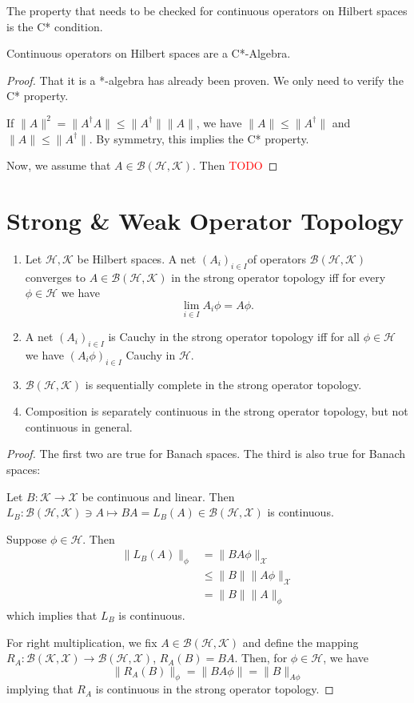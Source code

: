 \documentclass[twoside,symmetric, openany, 12pt]{./tuftebook}
\theoremstyle{definition}
\theoremstyle{definition}
\theoremstyle{definition}
\newenvironment{parts}{\begin{enumerate}[label=(\alph*)]}{\end{enumerate}}
\begin{document}
The property that needs to be checked for continuous operators on Hilbert spaces is the C* condition. 
\begin{Proposition}
	Continuous operators on Hilbert spaces are a C*-Algebra.
\end{Proposition}
\begin{proof}
That it is a *-algebra has already been proven. We only need to verify the C* property.

	If $\|A\|^2 = \|A^\dagger A\|\le \|A^\dagger\|\| A\|$, we have $\|A\|\le \|A^\dagger\|$ and $\|A\|\le \|A^\dagger\|$. By symmetry, this implies the C* property.

	Now, we assume that $A\in \mathcal{B}(\mathcal{H}, \mathcal{K})$. Then \textcolor{red}{TODO}
\end{proof}
\section{Strong \& Weak Operator Topology}
\begin{Proposition}
	\begin{parts}
	\item Let $\mathcal{H}, \mathcal{K}$ be Hilbert spaces. A net $(A_i)_{i\in I}$of operators $\mathcal{B}(\mathcal{H}, \mathcal{K})$ converges to $A\in \mathcal{B}(\mathcal{H}, \mathcal{K})$ in the strong operator topology iff for every $\phi\in \mathcal{H}$ we have
	\[
		\lim_{i\in I}A_i\phi = A\phi
	.\] 
\item A net $(A_i)_{i\in I}$ is Cauchy in the strong operator topology iff for all $\phi \in \mathcal{H}$ we have $(A_i\phi)_{i\in I}$ Cauchy in $\mathcal{H}$. 
\item $\mathcal{B}(\mathcal{H}, \mathcal{K})$ is sequentially complete in the strong operator topology.
\item Composition is separately continuous in the strong operator topology, but not continuous in general.
\end{parts}
\end{Proposition}
\begin{proof}
	The first two are true for Banach spaces. The third is also true for Banach spaces:

	Let $B : \mathcal{K}\to \mathcal{X}$ be continuous and linear. Then $L_B: \mathcal{B}(\mathcal{H}, \mathcal{K})\ni A \mapsto BA = L_B(A)\in \mathcal{B}(\mathcal{H}, \mathcal{X})$ is continuous. 

	Suppose $\phi \in \mathcal{H}$. Then
	 \begin{align*}
		 \|L_B(A)\|_\phi &= \|BA\phi\|_\mathcal{X}\\
		&\le \|B\|\|A\phi\|_{\mathcal{X}}\\
		&= \|B\|\|A\|_\phi
	\end{align*}
	which implies that $L_B$ is continuous. 

	For right multiplication, we fix $A\in \mathcal{B}(\mathcal{H}, \mathcal{K})$ and define the mapping $R_A:\mathcal{B}(\mathcal{K}, \mathcal{X})\to \mathcal{B}(\mathcal{H}, \mathcal{X})$, $R_A(B) = BA$. Then, for $\phi\in \mathcal{H}$, we have
	\[
		\|R_A(B)\|_\phi = \|BA\phi\| = \|B\|_{A\phi}
\]
implying that $R_A$ is continuous in the strong operator topology.
\end{proof}
\end{document}
